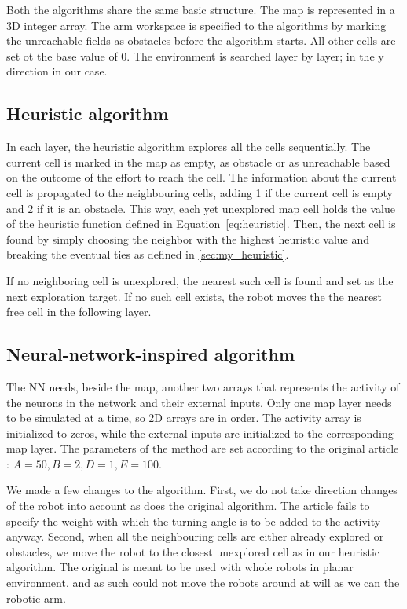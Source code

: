 \documentclass[buriama8_dp.tex]{subfiles}
\begin{document}
Both the algorithms share the same basic structure. The map is represented in a 3D integer array. The arm workspace is specified to the algorithms by marking the unreachable fields as obstacles before the algorithm starts. All other cells are set ot the base value of 0. The environment is searched layer by layer; in the \m y direction in our case. 

\subsection{Heuristic algorithm}
\label{subsec:impl_heur}

In each layer, the heuristic algorithm explores all the cells sequentially. The current cell is marked in the map as empty, as obstacle or as unreachable based on the outcome of the effort to reach the cell. The information about the current cell is propagated to the neighbouring cells, adding 1 if the current cell is empty and 2 if it is an obstacle. This way, each yet unexplored map cell holds the value of the heuristic function defined in Equation~\ref{eq:heuristic}. Then, the next cell is found by simply choosing the neighbor with the highest heuristic value and breaking the eventual ties as defined in \ref{sec:my_heuristic}.

If no neighboring cell is unexplored, the nearest such cell is found and set as the next exploration target. If no such cell exists, the robot moves the the nearest free cell in the following layer.

\subsection{Neural-network-inspired algorithm}
\label{subsec:impl_neuro}

The NN needs, beside the map, another two arrays that represents the activity of the neurons in the network and their external inputs. Only one map layer needs to be simulated at a time, so 2D arrays are in order. The activity array is initialized to zeros, while the external inputs are initialized to the corresponding map layer. The parameters of the method are set according to the original article \cite{neural}: \(A=50, B=2, D=1, E=100\).

We made a few changes to the algorithm. First, we do not take direction changes of the robot into account as does the original algorithm. The article fails to specify the weight with which the turning angle is to be added to the activity anyway. Second, when all the neighbouring cells are either already explored or obstacles, we move the robot to the closest unexplored cell as in our heuristic algorithm. The original is meant to be used with whole robots in planar environment, and as such could not move the robots around at will as we can the robotic arm.
\end{document}
